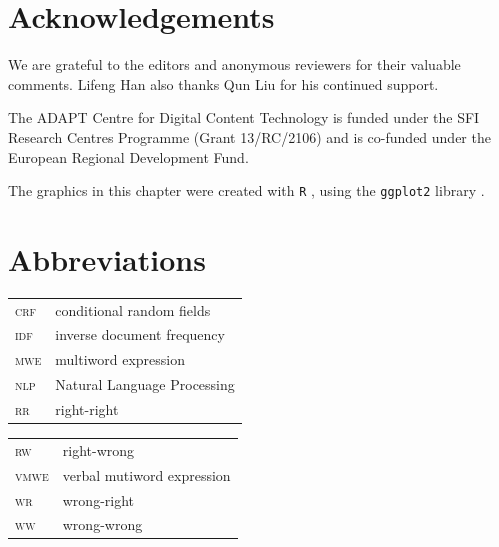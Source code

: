 \documentclass[output=paper,modfonts,nonflat]{langsci/langscibook}
\begin{document}
\section*{Acknowledgements}

We are grateful to the editors and anonymous reviewers for their valuable comments. Lifeng Han also thanks Qun Liu for his continued support. 

The ADAPT Centre for Digital Content Technology is funded under the SFI Research Centres Programme (Grant 13/RC/2106) and is co-funded under the European Regional Development Fund.



The graphics in this chapter were created with \texttt{R} \citep{R}, using the \texttt{ggplot2} library \citep{ggplot2}.


\section*{Abbreviations}

   \begin{tabularx}{.48\textwidth}{ll}
    \textsc{crf} & conditional random fields\\
   \textsc{idf}  & inverse document frequency\\  \textsc{mwe}  & multiword expression\\
  \textsc{nlp}  & Natural Language Processing\\
 \textsc{rr}  & right-right\\
      \end{tabularx}
      \begin{tabularx}{.48\textwidth}{ll}
 \textsc{rw}  & right-wrong\\
   \textsc{vmwe}  & verbal mutiword expression\\  \textsc{wr}  & wrong-right\\
  \textsc{ww}  & wrong-wrong\\
  \end{tabularx}


{\sloppy
\printbibliography[heading=subbibliography,notkeyword=this]
}
\end{document}
